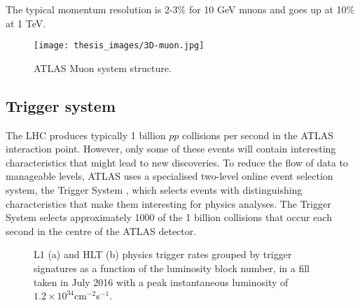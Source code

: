 \documentclass[a4paper, oneside, 11pt, openright]{book}
\begin{document}
				The typical momentum resolution is 2-3\% for 10 GeV muons and goes up at 10\% at 1 TeV.
				\begin{figure}
					\centering
					\texttt{[image: thesis\_images/3D-muon.jpg]}
					\caption{ATLAS Muon system structure.}
					\label{fig:muon detector}
				\end{figure}
			
			\subsection{Trigger system}
				The LHC produces typically 1 billion $pp$ collisions per second in the ATLAS interaction point. However, only some of these events will contain interesting characteristics that might lead to new discoveries. To reduce the flow of data to manageable levels, ATLAS uses a specialised two-level online event selection system, the Trigger System \cite{L1_trigger,HLT_trigger}, which selects events with distinguishing characteristics that make them interesting for physics analyses. The Trigger System selects approximately 1000 of the 1 billion collisions that occur each second in the centre of the ATLAS detector. 
				
				\begin{figure}
					\centering
					\caption{L1 (a) and HLT (b) physics trigger rates grouped by trigger signatures as a function of the luminosity block number, in a fill taken in July 2016 with a peak instantaneous luminosity of $1.2 \times 10^{34}$cm$^{-2}$s$^{-1}$.}
					\label{fig:Trigger system}
				\end{figure}
				
\end{document}
